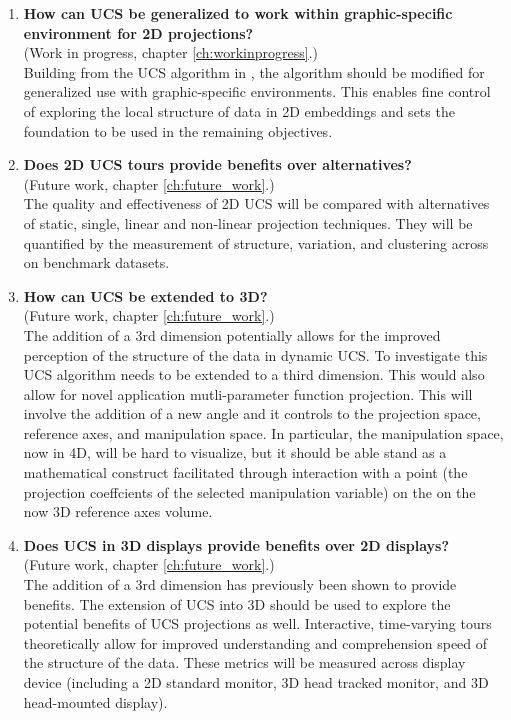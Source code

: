 \documentclass{monashthesis}
\begin{document}
\begin{enumerate}
\def\labelenumi{\arabic{enumi}.}
\item
  \textbf{How can UCS be generalized to work within graphic-specific
  environment for 2D projections?}\\
  (Work in progress, chapter \ref{ch:workinprogress}.)\\
  Building from the UCS algorithm in \textcite{cook_manual_1997}, the
  algorithm should be modified for generalized use with graphic-specific
  environments. This enables fine control of exploring the local
  structure of data in 2D embeddings and sets the foundation to be used
  in the remaining objectives.
\item
  \textbf{Does 2D UCS tours provide benefits over alternatives?}\\
  (Future work, chapter \ref{ch:future_work}.)\\
  The quality and effectiveness of 2D UCS will be compared with
  alternatives of static, single, linear and non-linear projection
  techniques. They will be quantified by the measurement of structure,
  variation, and clustering across on benchmark datasets.
\item
  \textbf{How can UCS be extended to 3D?}\\
  (Future work, chapter \ref{ch:future_work}.)\\
  The addition of a 3rd dimension potentially allows for the improved
  perception of the structure of the data in dynamic UCS. To investigate
  this UCS algorithm needs to be extended to a third dimension. This
  would also allow for novel application mutli-parameter function
  projection. This will involve the addition of a new angle and it
  controls to the projection space, reference axes, and manipulation
  space. In particular, the manipulation space, now in 4D, will be hard
  to visualize, but it should be able stand as a mathematical construct
  facilitated through interaction with a point (the projection
  coeffcients of the selected manipulation variable) on the on the now
  3D reference axes volume.
\item
  \textbf{Does UCS in 3D displays provide benefits over 2D displays?}\\
  (Future work, chapter \ref{ch:future_work}.)\\
  The addition of a 3rd dimension has previously been shown to provide
  benefits. The extension of UCS into 3D should be used to explore the
  potential benefits of UCS projections as well. Interactive,
  time-varying tours theoretically allow for improved understanding and
  comprehension speed of the structure of the data. These metrics will
  be measured across display device (including a 2D standard monitor, 3D
  head tracked monitor, and 3D head-mounted display).
\end{enumerate}
\end{document}
